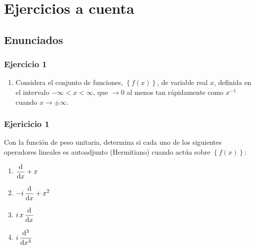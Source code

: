 \documentclass[12pt]{beamer}
\begin{document}
\section{Ejercicios a cuenta}
\subsection{Enunciados}

\begin{frame}
\frametitle{Ejercicio 1}
\begin{enumerate}[<+->]
\item Considera el conjunto de funciones, $\left\{ f (x) \right\}$, de variable real $x$, definida en el intervalo $-\infty < x < \infty$, que $\to 0$ al menos tan rápidamente como $x^{-1}$ cuando $x \to \pm \infty$.
\seti
\end{enumerate}
\end{frame}
\begin{frame}
\frametitle{Ejericicio 1}
Con la función de peso unitaria, determina si cada uno de los siguientes operadores lineales es autoadjunto (Hermitiano) cuando actúa sobre $\left\{ f (x) \right\}$:
\begin{multicols}{2}
  \begin{enumerate}
    \item $\displaystyle \dv{x} + x$
    \item $\displaystyle - i \, \dv{x} + x^{2}$
    \item $\displaystyle i \, x \, \dv{x}$
    \item $\displaystyle i \, \dv[3]{x}$
  \end{enumerate}
\end{multicols}
\end{frame}
\end{document}
